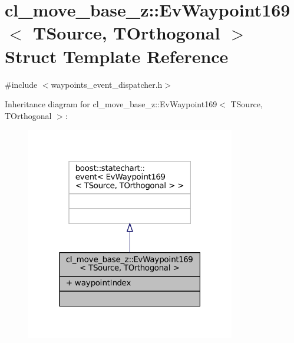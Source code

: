 \hypertarget{structcl__move__base__z_1_1EvWaypoint169}{}\section{cl\+\_\+move\+\_\+base\+\_\+z\+:\+:Ev\+Waypoint169$<$ T\+Source, T\+Orthogonal $>$ Struct Template Reference}
\label{structcl__move__base__z_1_1EvWaypoint169}


{\ttfamily \#include $<$waypoints\+\_\+event\+\_\+dispatcher.\+h$>$}



Inheritance diagram for cl\+\_\+move\+\_\+base\+\_\+z\+:\+:Ev\+Waypoint169$<$ T\+Source, T\+Orthogonal $>$\+:
\nopagebreak
\begin{figure}[H]
\begin{center}
\leavevmode
\includegraphics[width=259pt]{structcl__move__base__z_1_1EvWaypoint169__inherit__graph}
\end{center}
\end{figure}


